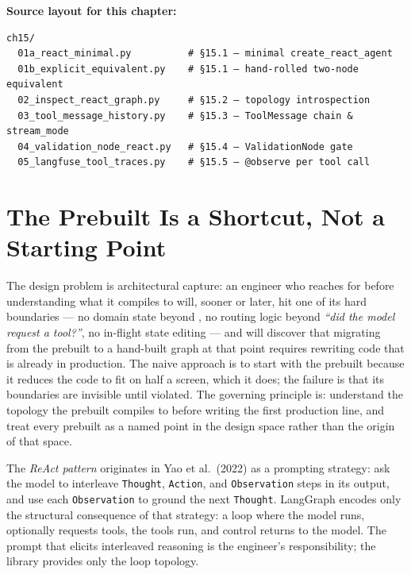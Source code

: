 \medskip
\noindent\textbf{Source layout for this chapter:}
\begin{verbatim}
ch15/
  01a_react_minimal.py          # §15.1 — minimal create_react_agent
  01b_explicit_equivalent.py    # §15.1 — hand-rolled two-node equivalent
  02_inspect_react_graph.py     # §15.2 — topology introspection
  03_tool_message_history.py    # §15.3 — ToolMessage chain & stream_mode
  04_validation_node_react.py   # §15.4 — ValidationNode gate
  05_langfuse_tool_traces.py    # §15.5 — @observe per tool call
\end{verbatim}


\section{The Prebuilt Is a Shortcut, Not a Starting Point}
\label{sec:react-convenience}

The design problem is architectural capture: an engineer who reaches for
 before understanding what it compiles to will,
sooner or later, hit one of its hard boundaries --- no domain state beyond
, no routing logic beyond \emph{``did the model request a
tool?''}, no in-flight state editing --- and will discover that migrating
from the prebuilt to a hand-built graph at that point requires rewriting
code that is already in production. The naive approach is to start with the
prebuilt because it reduces the code to fit on half a screen, which it does;
the failure is that its boundaries are invisible until violated. The
governing principle is: understand the topology the prebuilt compiles to
before writing the first production line, and treat every prebuilt as a
named point in the design space rather than the origin of that space.

The \emph{ReAct pattern} originates in Yao et al.\ (2022) as a prompting
strategy: ask the model to interleave \texttt{Thought}, \texttt{Action}, and
\texttt{Observation} steps in its output, and use each \texttt{Observation}
to ground the next \texttt{Thought}. LangGraph encodes only the structural
consequence of that strategy: a loop where the model runs, optionally
requests tools, the tools run, and control returns to the model.
The prompt that elicits interleaved reasoning is the engineer's
responsibility; the library provides only the loop topology.

